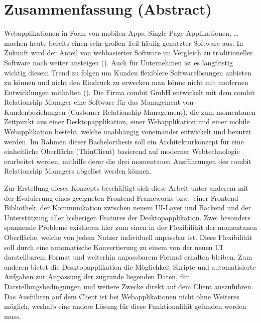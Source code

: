 \chapter{Zusammenfassung (Abstract)}

Webapplikationen in Form von mobilen Apps, Single-Page-Applikationen, \ldots {} machen heute bereits einen sehr großen Teil häufig genutzter Software aus.
In Zukunft wird der Anteil von webbasierter Software im Vergleich zu traditioneller Software noch weiter ansteigen ().
Auch für Unternehmen ist es langfristig wichtig diesem Trend zu folgen um Kunden flexiblere Softwarelösungen anbieten zu können und nicht den Eindruck zu erwecken man könne nicht mit modernen Entwicklungen mithalten ().
Die Firma combit GmbH entwickelt mit dem combit Relationship Manager eine Software für das Management von Kundenbeziehungen (Customer Relationship Management), die zum momentanen Zeitpunkt aus einer Desktopapplikation, einer Webapplikation und einer mobile Webapplikation besteht, welche unabhängig voneinander entwickelt und benutzt werden.
Im Rahmen dieser Bachelorthesis soll ein Architekturkonzept für eine einheitliche Oberfläche (ThinClient) basierend auf moderner Webtechnologie erarbeitet werden, mithilfe derer die drei momentanen Ausführungen des combit Relationship Managers abgelöst werden können.

Zur Erstellung dieses Konzepts beschäftigt sich diese Arbeit unter anderem mit der Evaluierung eines geeigneten Frontend-Frameworks bzw.\ einer Frontend-Bibliothek, der Kommunikation zwischen neuem UI-Layer und Backend und der Unterstützung aller bisherigen Features der Desktopapplikation.
Zwei besonders spannende Probleme existieren hier zum einen in der Flexibilität der momentanen Oberfläche, welche von jedem Nutzer individuell anpassbar ist. Diese Flexibilität soll durch eine automatische Konvertierung zu einem von der neuen UI darstellbarem Format und weiterhin anpassbarem Format erhalten bleiben. 
Zum anderen bietet die Desktopapplikation die Möglichkeit Skripte und automatisierte Aufgaben zur Anpassung der zugrunde liegenden Daten, für Darstellungsbedingungen und weitere Zwecke direkt auf dem Client auszuführen. Das Ausführen auf dem Client ist bei Webapplikationen nicht ohne Weiteres möglich, weshalb eine andere Lösung für diese Funktionalität gefunden werden muss.

